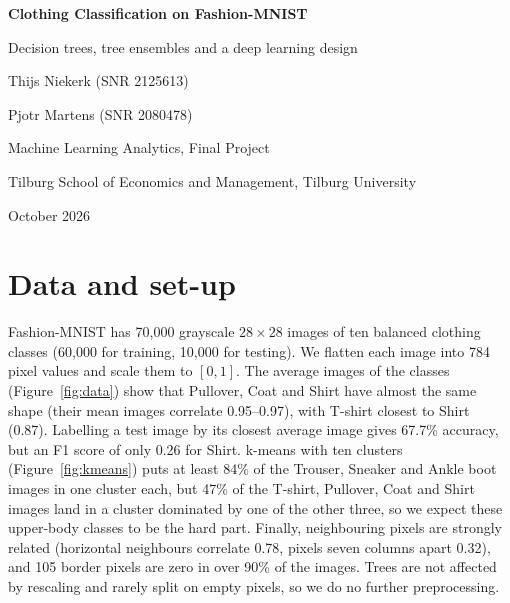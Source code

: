 \documentclass[11pt,a4paper]{article}
\begin{document}
\begin{titlepage}
\centering
\vspace*{4cm}
{\LARGE\bfseries Clothing Classification on Fashion-MNIST\par}
\vspace{0.4cm}
{\large Decision trees, tree ensembles and a deep learning design\par}
\vspace{2.5cm}
{\large Thijs Niekerk \quad (SNR 2125613)\par}
\vspace{0.15cm}
{\large Pjotr Martens \quad (SNR 2080478)\par}
\vfill
{Machine Learning Analytics, Final Project\par}
\vspace{0.15cm}
{Tilburg School of Economics and Management, Tilburg University\par}
\vspace{0.15cm}
{October 2026\par}
\vspace*{1.5cm}
\end{titlepage}
\setcounter{page}{1}

\section{Data and set-up}
Fashion-MNIST \citep{xiao2017} has 70{,}000 grayscale $28\times28$ images of ten balanced clothing classes (60{,}000 for training, 10{,}000 for testing). We flatten each image into 784 pixel values and scale them to $[0,1]$. The average images of the classes (Figure~\ref{fig:data}) show that Pullover, Coat and Shirt have almost the same shape (their mean images correlate 0.95--0.97), with T-shirt closest to Shirt (0.87). Labelling a test image by its closest average image gives 67.7\% accuracy, but an F1 score of only 0.26 for Shirt. k-means with ten clusters (Figure~\ref{fig:kmeans}) puts at least 84\% of the Trouser, Sneaker and Ankle boot images in one cluster each, but 47\% of the T-shirt, Pullover, Coat and Shirt images land in a cluster dominated by one of the other three, so we expect these upper-body classes to be the hard part. Finally, neighbouring pixels are strongly related (horizontal neighbours correlate 0.78, pixels seven columns apart 0.32), and 105 border pixels are zero in over 90\% of the images. Trees are not affected by rescaling and rarely split on empty pixels, so we do no further preprocessing.
\end{document}
